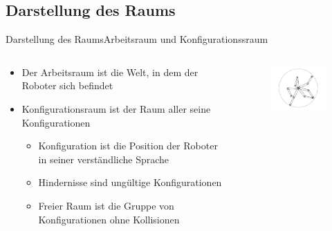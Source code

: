 \documentclass[t,aspectratio=169,dvipsnames]{beamer}
\begin{document}
\subsection{Darstellung des Raums}
\begin{frame}{Darstellung des Raums}{Arbeitsraum und Konfigurationssraum}
	\begin{columns}
		\begin{column}[T]{0.6\textwidth}
			\begin{itemize}
				\item Der Arbeitsraum ist die Welt, in dem der Roboter sich befindet\newline
				\item Konfigurationsraum ist der Raum aller seine Konfigurationen
				\begin{itemize}
					\item Konfiguration ist die Position der Roboter in seiner verständliche Sprache
					\item Hindernisse sind ungültige Konfigurationen
					\item Freier Raum ist die Gruppe von Konfigurationen ohne Kollisionen
					
				\end{itemize}
			\end{itemize}
		\end{column}
		\begin{column}[T]{0.4\textwidth}
			\begin{figure}
				\includegraphics[width=4.5cm]{images/Bild2.png}
			\end{figure}
		\end{column}
	\end{columns}
\end{frame}
\end{document}

